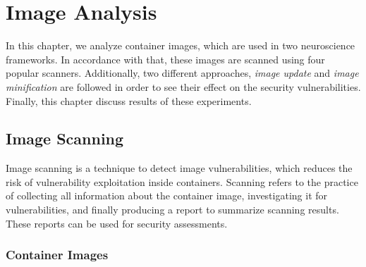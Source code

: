 \chapter{Image Analysis}\label{chapter3}

In this chapter, we analyze container images, which are used in
two neuroscience frameworks. In accordance with that, these
images are scanned using four popular scanners. Additionally,
two different approaches, \textit{image update} and \textit{
image minification} are followed in order to see their
effect on the security vulnerabilities. Finally, this
chapter discuss results of
these experiments.

\section{Image Scanning}
Image scanning is a technique to
detect image vulnerabilities, which reduces the risk of vulnerability exploitation
inside containers. Scanning refers to the practice of collecting all
information about the container image,
investigating it for
vulnerabilities, and finally producing a report to
summarize scanning results. These reports can be used for security assessments.

\subsection{Container Images}

